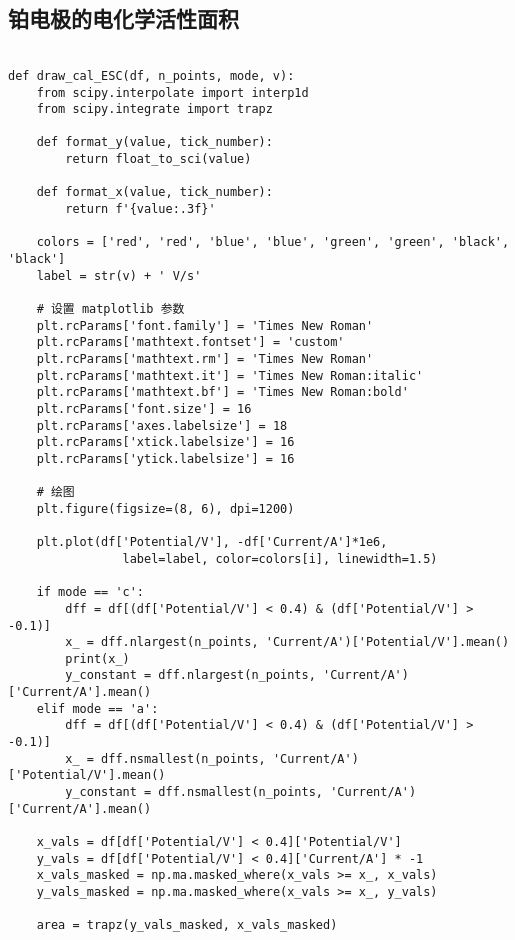 \subsection{铂电极的电化学活性面积}

\begin{verbatim}

def draw_cal_ESC(df, n_points, mode, v):
    from scipy.interpolate import interp1d
    from scipy.integrate import trapz

    def format_y(value, tick_number):
        return float_to_sci(value)

    def format_x(value, tick_number):
        return f'{value:.3f}'

    colors = ['red', 'red', 'blue', 'blue', 'green', 'green', 'black', 'black']
    label = str(v) + ' V/s'

    # 设置 matplotlib 参数
    plt.rcParams['font.family'] = 'Times New Roman'
    plt.rcParams['mathtext.fontset'] = 'custom'
    plt.rcParams['mathtext.rm'] = 'Times New Roman'
    plt.rcParams['mathtext.it'] = 'Times New Roman:italic'
    plt.rcParams['mathtext.bf'] = 'Times New Roman:bold'
    plt.rcParams['font.size'] = 16
    plt.rcParams['axes.labelsize'] = 18
    plt.rcParams['xtick.labelsize'] = 16
    plt.rcParams['ytick.labelsize'] = 16

    # 绘图
    plt.figure(figsize=(8, 6), dpi=1200)

    plt.plot(df['Potential/V'], -df['Current/A']*1e6, 
                label=label, color=colors[i], linewidth=1.5)

    if mode == 'c':
        dff = df[(df['Potential/V'] < 0.4) & (df['Potential/V'] > -0.1)]
        x_ = dff.nlargest(n_points, 'Current/A')['Potential/V'].mean()
        print(x_)
        y_constant = dff.nlargest(n_points, 'Current/A')['Current/A'].mean()
    elif mode == 'a':
        dff = df[(df['Potential/V'] < 0.4) & (df['Potential/V'] > -0.1)]
        x_ = dff.nsmallest(n_points, 'Current/A')['Potential/V'].mean()
        y_constant = dff.nsmallest(n_points, 'Current/A')['Current/A'].mean()

    x_vals = df[df['Potential/V'] < 0.4]['Potential/V']
    y_vals = df[df['Potential/V'] < 0.4]['Current/A'] * -1
    x_vals_masked = np.ma.masked_where(x_vals >= x_, x_vals)
    y_vals_masked = np.ma.masked_where(x_vals >= x_, y_vals)

    area = trapz(y_vals_masked, x_vals_masked) 


\end{verbatim}
